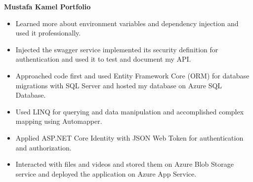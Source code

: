 {\bfseries Mustafa Kamel Portfolio}\hspace{0.5cm}{\small Sep. 2022 -- Oct. 2022}
\begin{itemize}
    \item Learned more about environment variables and dependency injection and used it professionally.
    \item Injected the swagger service implemented its security definition for authentication and used it to test and document my API.
    \item Approached code first and used Entity Framework Core (ORM) for database migrations with SQL Server and hosted my database on Azure SQL Database.
    \item Used LINQ for querying and data manipulation and accomplished complex mapping using Automapper.
    \item Applied ASP.NET Core Identity with JSON Web Token for authentication and authorization.
    \item Interacted with files and videos and stored them on Azure Blob Storage service and deployed the application on Azure App Service.
\end{itemize}